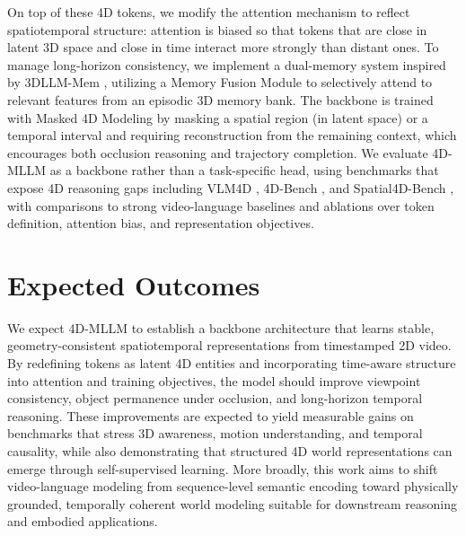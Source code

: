 \documentclass[12pt]{article}
\begin{document}
On top of these 4D tokens, we modify the attention mechanism to reflect spatiotemporal structure: attention is biased so that tokens that are close in latent 3D space and close in time interact more strongly than distant ones. To manage long-horizon consistency, we implement a dual-memory system inspired by 3DLLM-Mem \cite{hu20253dllmmemlongtermspatialtemporalmemory}, utilizing a Memory Fusion Module to selectively attend to relevant features from an episodic 3D memory bank. The backbone is trained with Masked 4D Modeling by masking a spatial region (in latent space) or a temporal interval and requiring reconstruction from the remaining context, which encourages both occlusion reasoning and trajectory completion. We evaluate 4D-MLLM as a backbone rather than a task-specific head, using benchmarks that expose 4D reasoning gaps including VLM4D \cite{zhou2025vlm4dspatiotemporalawarenessvision}, 4D-Bench \cite{zhu20254dbenchbenchmarkingmultimodallarge}, and Spatial4D-Bench \cite{wang2025spatial4dbenchversatile4dspatial}, with comparisons to strong video-language baselines \cite{zhang2023videollamainstructiontunedaudiovisuallanguage, zhang2024llavanextvideo} and ablations over token definition, attention bias, and representation objectives.

\section{Expected Outcomes}
\label{sec:outcomes}

We expect 4D-MLLM to establish a backbone architecture that learns stable, geometry-consistent spatiotemporal representations from timestamped 2D video. By redefining tokens as latent 4D entities and incorporating time-aware structure into attention and training objectives, the model should improve viewpoint consistency, object permanence under occlusion, and long-horizon temporal reasoning. These improvements are expected to yield measurable gains on benchmarks that stress 3D awareness, motion understanding, and temporal causality, while also demonstrating that structured 4D world representations can emerge through self-supervised learning. More broadly, this work aims to shift video-language modeling from sequence-level semantic encoding toward physically grounded, temporally coherent world modeling suitable for downstream reasoning and embodied applications.

\newpage


\end{document}
